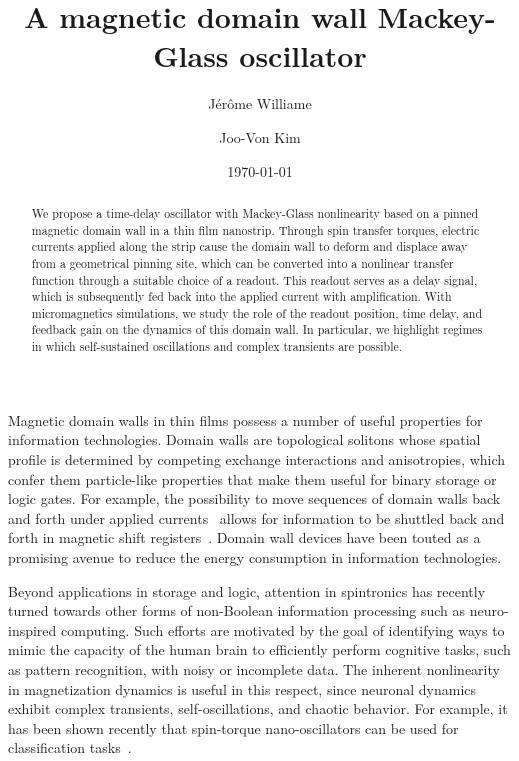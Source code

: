 \documentclass[aip,reprint,amsmath,amssymb,floatfix,superscriptaddress]{revtex4-1}
\begin{document}
\title{A magnetic domain wall Mackey-Glass oscillator}

\author{J{\'e}r{\^o}me Williame}
\author{Joo-Von Kim}

\date{\today}%

\begin{abstract}
We propose a time-delay oscillator with Mackey-Glass nonlinearity based on a pinned magnetic domain wall in a thin film nanostrip. Through spin transfer torques, electric currents applied along the strip cause the domain wall to deform and displace away from a geometrical pinning site, which can be converted into a nonlinear transfer function through a suitable choice of a readout. This readout serves as a delay signal, which is subsequently fed back into the applied current with amplification. With micromagnetics simulations, we study the role of the readout position, time delay, and feedback gain on the dynamics of this domain wall. In particular, we highlight regimes in which self-sustained oscillations and complex transients are possible.
\end{abstract}



\maketitle


Magnetic domain walls in thin films possess a number of useful properties for information technologies. Domain walls are topological solitons whose spatial profile is determined by competing exchange interactions and anisotropies, which confer them particle-like properties that make them useful for binary storage or logic gates. For example, the possibility to move sequences of domain walls back and forth under applied currents~\cite{Grollier:2003kt, Vernier:2004dg, Yamaguchi:2004in, Yamanouchi:2004cs, Klaui:2005hb} allows for information to be shuttled back and forth in magnetic shift registers~\cite{Parkin:2008gs}. Domain wall devices have been touted as a promising avenue to reduce the energy consumption in information technologies.


Beyond applications in storage and logic, attention in spintronics has recently turned towards other forms of non-Boolean information processing such as neuro-inspired computing. Such efforts are motivated by the goal of identifying ways to mimic the capacity of the human brain to efficiently perform cognitive tasks, such as pattern recognition, with noisy or incomplete data. The inherent nonlinearity in magnetization dynamics is useful in this respect, since neuronal dynamics exhibit complex transients, self-oscillations, and chaotic behavior. For example, it has been shown recently that spin-torque nano-oscillators can be used for classification tasks~\cite{Torrejon:2017hj, Romera:2018dm, Riou:2019ik}.
\end{document}
